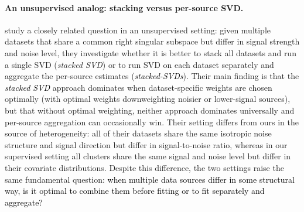 \documentclass{article}
\theoremstyle{plain}
\theoremstyle{remark}
\begin{document}
\paragraph{An unsupervised analog: stacking versus per-source SVD.}
\citet{baharav2025stackedsvd} study a closely related question in an unsupervised setting: given multiple datasets that share a common right singular subspace but differ in signal strength and noise level, they investigate whether it is better to stack all datasets and run a single SVD (\emph{stacked SVD}) or to run SVD on each dataset separately and aggregate the per-source estimates (\textcolor{black}{\emph{stacked-SVDs}}). Their main finding is that the \textcolor{black}{\emph{stacked SVD}} approach dominates when dataset-specific weights are chosen optimally (with optimal weights downweighting noisier or lower-signal sources), but that without optimal weighting, neither approach dominates universally and per-source aggregation can occasionally win. Their setting differs from ours in the source of heterogeneity: all of their datasets share the same isotropic noise structure and signal direction but differ in signal-to-noise ratio, whereas in our supervised setting all clusters share the same signal and noise level but differ in their covariate distributions. Despite this difference, the two settings raise the same fundamental question: \textcolor{black}{when multiple data sources differ in some structural way, is it optimal to combine them before fitting or to fit separately and aggregate?}
\end{document}
